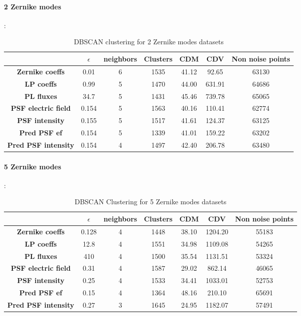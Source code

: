 		\paragraph{2 Zernike modes}:
		\begin{table}[h!]
			\centering
			\begin{tabular}{|c|c|c|c|c|c|c|}
				\hline
				\textbf{} & \textbf{$\epsilon$} & \textbf{neighbors} & \textbf{Clusters} & \textbf{CDM} & \textbf{CDV} & \textbf{Non noise points}\\
				\hline
				\textbf{Zernike coeffs} & 0.01 & 6 & 1535 & 41.12 & 92.65 & 63130 \\
				\hline
				\textbf{LP coeffs} & 0.99 & 5 & 1470 & 44.00 & 631.91 & 64686 \\
				\hline
				\textbf{PL fluxes} & 34.7 & 5 & 1431 & 45.46 & 739.78 & 65065 \\
				\hline
				\textbf{PSF electric field} & 0.154 & 5 & 1563 & 40.16 & 110.41 & 62774 \\
				\hline
				\textbf{PSF intensity} & 0.155 & 5 & 1517 & 41.61 & 124.37 & 63125 \\
				\hline
				\textbf{Pred PSF ef} & 0.154 & 5 & 1339 & 41.01 & 159.22 & 63202 \\
				\hline
				\textbf{Pred PSF intensity} & 0.154 & 4 & 1497 & 42.40 & 206.78 & 63480 \\
				\hline
			\end{tabular}
		\caption{DBSCAN clustering for 2 Zernike modes datasets}
		\end{table}
		\FloatBarrier
		
		\paragraph{5 Zernike modes}:
		\begin{table}[h!]
			\centering
			\begin{tabular}{|c|c|c|c|c|c|c|}
				\hline
				\textbf{} & \textbf{$\epsilon$} & \textbf{neighbors} & \textbf{Clusters} & \textbf{CDM} & \textbf{CDV} & \textbf{Non noise points}\\
				\hline
				\textbf{Zernike coeffs} & 0.128 & 4 & 1448 & 38.10 & 1204.20 & 55183 \\
				\hline
				\textbf{LP coeffs} & 12.8 & 4 & 1551 & 34.98 & 1109.08 & 54265 \\
				\hline
				\textbf{PL fluxes} & 410 & 4 & 1500 & 35.54 & 1131.51 & 53324 \\
				\hline
				\textbf{PSF electric field} & 0.31 & 4 & 1587 & 29.02 & 862.14 & 46065 \\
				\hline
				\textbf{PSF intensity} & 0.25 & 4 & 1533 & 34.41 & 1033.01 & 52753 \\
				\hline
				\textbf{Pred PSF ef} & 0.15 & 4 & 1364 & 48.16 & 210.10 & 65691 \\
				\hline
				\textbf{Pred PSF intensity} & 0.27 & 3 & 1645 & 24.95 & 1182.07 & 57491 \\
				\hline
			\end{tabular}
		\caption{DBSCAN Clustering for 5 Zernike modes datasets}
		\end{table}
		\FloatBarrier
		
